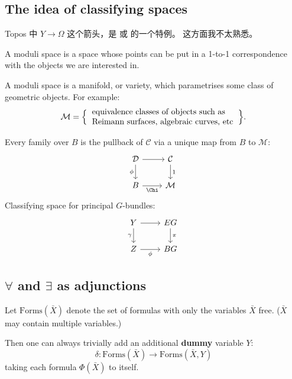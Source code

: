 \subsection{The idea of classifying spaces}

Topos 中 $Y \rightarrow \Omega$ 这个箭头，是  或  的一个特例。  这方面我不太熟悉。

A moduli space is a space whose points can be put in a 1-to-1 correspondence with the objects we are interested in.

A moduli space is a manifold, or variety, which parametrises some class of
geometric objects.  For example:
\begin{equation}
\mathcal{M} = 
 \Big\{ \begin{tabular}{l}
 equivalence classes of objects such as \\
 Reimann surfaces, algebraic curves, etc
 \end{tabular}
 \Big\}.
\end{equation}

Every family over $B$ is the pullback of $\mathcal{C}$ via a unique map from $B$ to $\mathcal{M}$:
\begin{equation}
\label{eqn:moduli-space}
\begin{tikzcd}[column sep = normal]
\mathcal{D} \arrow[r] \arrow[d, swap, "\phi"] & \mathcal{C} \arrow[d, "1"] \\
B \arrow[r, swap, "\Chi"] & \mathcal{M}
\end{tikzcd}
\end{equation}
Classifying space for principal $G$-bundles:
\begin{equation}
\begin{tikzcd}[column sep = normal]
Y \arrow[r] \arrow[d, swap, "\gamma"] & EG \arrow[d, "\pi"] \\
Z \arrow[r, swap, "\phi"] & BG
\end{tikzcd}
\end{equation}

\subsection{$\forall$ and $\exists$ as adjunctions}

Let $\mbox{Forms}(\bar{X})$ denote the set of formulas with only the variables $\bar{X}$ free. ($\bar{X}$ may contain multiple variables.)

Then one can always trivially add an additional \textbf{dummy} variable $Y$:
\begin{equation}
\delta : \mbox{Forms}(\bar{X}) \rightarrow \mbox{Forms}(\bar{X}, Y)
\end{equation}
taking each formula $\Phi(\bar{X})$ to itself.


